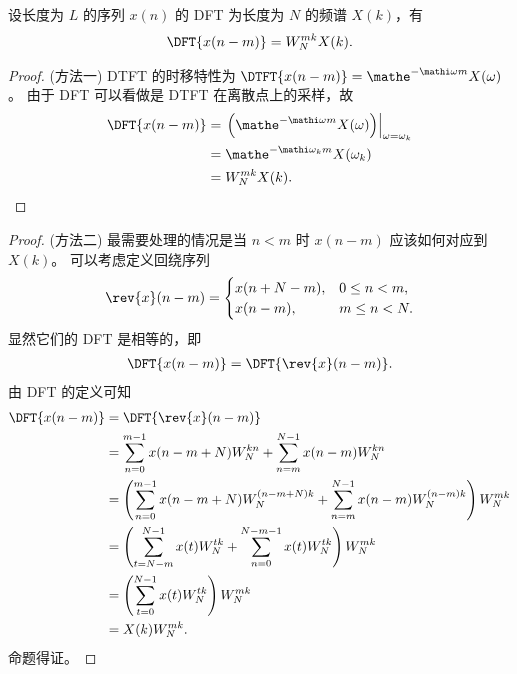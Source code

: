 \begin{property}
    设长度为 $L$ 的序列 $x(n)$ 的 DFT 为长度为 $N$ 的频谱 $X(k)$，有
    \begin{align*}
        \DFT{x(n - m)} = W_N^{mk}X(k).
    \end{align*}
\end{property}

\begin{proof}
    (方法一)
    DTFT 的时移特性为 $\DTFT{x(n - m)} = \mathe^{-\mathi\omega m}X(\omega)$。
    由于 DFT 可以看做是 DTFT 在离散点上的采样，故
    \begin{align*}
        \DFT{x(n - m)} & = \left.\left(\mathe^{-\mathi\omega m}X(\omega)\right)\right|_{\omega = \omega_k} \\
        & = \mathe^{-\mathi\omega_k m}X(\omega_k) \\
        & = W_N^{mk}X(k).
    \end{align*}
\end{proof}

\begin{proof}
    (方法二)
    最需要处理的情况是当 $n < m$ 时 $x(n - m)$ 应该如何对应到 $X(k)$。
    可以考虑定义回绕序列
    \begin{align*}
        \rev{x}(n - m) = \begin{cases}
            x(n + N - m), & 0 \le n < m, \\
            x(n - m), & m \le n < N.
        \end{cases}
    \end{align*}
    显然它们的 DFT 是相等的，即
    \begin{align*}
        \DFT{x(n - m)} = \DFT{\rev{x}(n - m)}.
    \end{align*}
    由 DFT 的定义可知
    \begin{align*}
        \DFT{x(n - m)} & = \DFT{\rev{x}(n - m)} \\
        & = \sum_{n = 0}^{m - 1}x(n - m + N)W_N^{kn}
            + \sum_{n = m}^{N - 1}x(n - m)W_N^{kn} \\
        & = \left(\sum_{n = 0}^{m - 1}x(n - m + N)W_N^{(n - m + N)k}
            + \sum_{n = m}^{N - 1}x(n - m)W_N^{(n - m)k}\right)W_N^{mk} \\
        & = \left(\sum_{t = N - m}^{N - 1}x(t)W_N^{tk}
            + \sum_{n = 0}^{N - m - 1}x(t)W_N^{tk}\right)W_N^{mk} \\
        & = \left(\sum_{t = 0}^{N - 1}x(t)W_N^{tk}\right)W_N^{mk} \\
        & = X(k)W_N^{mk}. 
    \end{align*}
    命题得证。
\end{proof}

